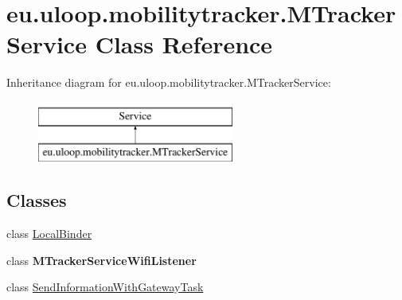 \hypertarget{classeu_1_1uloop_1_1mobilitytracker_1_1MTrackerService}{\section{eu.\+uloop.\+mobilitytracker.\+M\+Tracker\+Service Class Reference}
\label{classeu_1_1uloop_1_1mobilitytracker_1_1MTrackerService}
}
Inheritance diagram for eu.\+uloop.\+mobilitytracker.\+M\+Tracker\+Service\+:\begin{figure}[H]
\begin{center}
\leavevmode
\includegraphics[height=2.000000cm]{classeu_1_1uloop_1_1mobilitytracker_1_1MTrackerService}
\end{center}
\end{figure}
\subsection*{Classes}
\begin{DoxyCompactItemize}
\item 
class \hyperlink{classeu_1_1uloop_1_1mobilitytracker_1_1MTrackerService_1_1LocalBinder}{Local\+Binder}
\item 
class {\bfseries M\+Tracker\+Service\+Wifi\+Listener}
\item 
class \hyperlink{classeu_1_1uloop_1_1mobilitytracker_1_1MTrackerService_1_1SendInformationWithGatewayTask}{Send\+Information\+With\+Gateway\+Task}
\end{DoxyCompactItemize}
